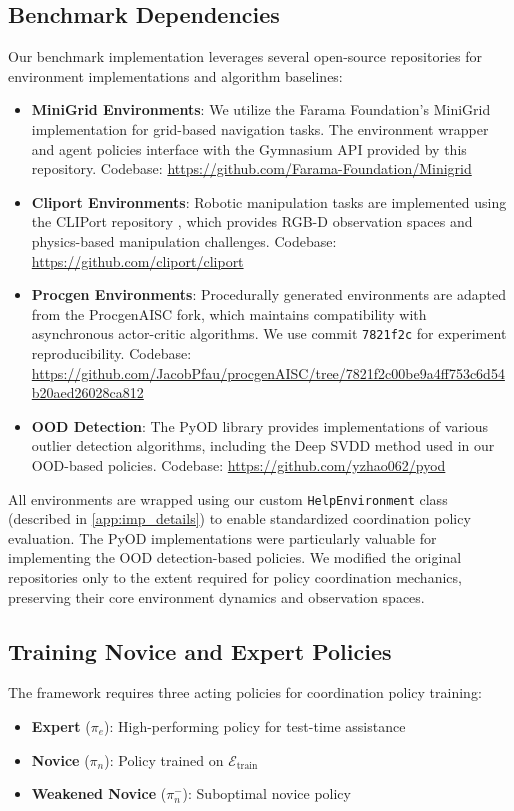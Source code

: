 \subsection{Benchmark Dependencies}
Our benchmark implementation leverages several open-source repositories for environment implementations and algorithm baselines:

\begin{itemize}
\item \textbf{MiniGrid Environments}: We utilize the Farama Foundation's MiniGrid implementation \citep{MinigridMiniworld23} for grid-based navigation tasks. The environment wrapper and agent policies interface with the Gymnasium API provided by this repository. Codebase: \url{https://github.com/Farama-Foundation/Minigrid}
\item \textbf{Cliport Environments}: Robotic manipulation tasks are implemented using the CLIPort repository \citep{shridhar2021cliport}, which provides RGB-D observation spaces and physics-based manipulation challenges. Codebase: \url{https://github.com/cliport/cliport}
\item \textbf{Procgen Environments}: Procedurally generated environments are adapted from the ProcgenAISC fork, which maintains compatibility with asynchronous actor-critic algorithms. We use commit \texttt{7821f2c} for experiment reproducibility. Codebase: \url{https://github.com/JacobPfau/procgenAISC/tree/7821f2c00be9a4ff753c6d54b20aed26028ca812}
\item \textbf{OOD Detection}: The PyOD library \citep{zhao2019pyod} provides implementations of various outlier detection algorithms, including the Deep SVDD method used in our OOD-based policies. Codebase: \url{https://github.com/yzhao062/pyod}
\end{itemize}

All environments are wrapped using our custom \texttt{HelpEnvironment} class (described in \autoref{app:imp_details}) to enable standardized coordination policy evaluation. The PyOD implementations were particularly valuable for implementing the OOD detection-based policies. We modified the original repositories only to the extent required for policy coordination mechanics, preserving their core environment dynamics and observation spaces.



\subsection{Training Novice and Expert Policies}
The \ourMethod framework requires three acting policies for coordination policy training:
\begin{itemize}
    \item \textbf{Expert} ($\pi_e$): High-performing policy for test-time assistance
    \item \textbf{Novice} ($\pi_n$): Policy trained on $\mathcal{E}_{\text{train}}$
    \item \textbf{Weakened Novice} ($\pi_n^-$): Suboptimal novice policy
\end{itemize}

